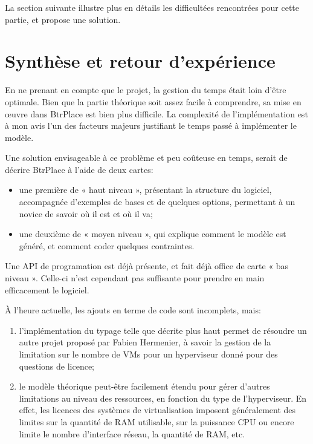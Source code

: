 \documentclass[a4paper]{article}
\begin{document}
La section suivante illustre plus en détails les difficultées rencontrées
pour cette partie, et propose une solution.
\section{Synthèse et retour d'expérience}
En ne prenant en compte que le projet, la gestion du temps était
loin d'être optimale. Bien que la partie théorique soit assez facile
à comprendre, sa mise en œuvre dans BtrPlace est bien plus difficile.
La complexité de l'implémentation est à mon avis l'un des facteurs
majeurs justifiant le temps passé à implémenter le modèle.

Une solution envisageable à ce problème et peu coûteuse en temps, serait 
de décrire BtrPlace à l'aide de deux cartes:
\begin{itemize}
	\item une première de « haut niveau », présentant la structure
		du logiciel, accompagnée d'exemples de bases et de quelques
		options, permettant à un novice de savoir où il est et où il va;
	\item une deuxième de « moyen niveau », qui explique comment le
		modèle est généré, et comment coder quelques contraintes.
\end{itemize}
Une API de programation est déjà présente, et fait déjà office de
carte « bas niveau ». Celle-ci n'est cependant pas suffisante pour
prendre en main efficacement le logiciel.

À l'heure actuelle, les ajouts en terme de code sont incomplets, mais:
\begin{enumerate}
	\item l'implémentation du typage telle que décrite plus haut
		permet de résoudre un autre projet proposé par Fabien
		Hermenier, à savoir la gestion de la limitation sur le nombre
		de VMs pour un hyperviseur donné pour des questions de
		licence;
	\item le modèle théorique peut-être facilement étendu pour gérer
		d'autres limitations au niveau des ressources, en fonction
		du type de l'hyperviseur. En effet, les licences des systèmes
		de virtualisation imposent généralement des limites sur la
		quantité de RAM utilisable, sur la puissance CPU ou encore
		limite le nombre d'interface réseau, la quantité de RAM, etc.
\end{enumerate}
\end{document}
